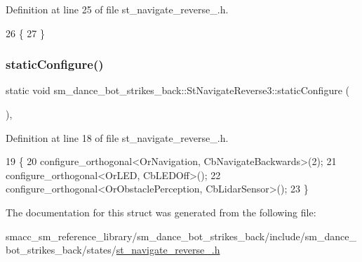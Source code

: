 Definition at line 25 of file st\+\_\+navigate\+\_\+reverse\+\_.\+h.


\begin{DoxyCode}
26    \{
27    \}
\end{DoxyCode}
\mbox{\label{structsm__dance__bot__strikes__back_1_1StNavigateReverse3_a4670afe58480a98550b4139930b95e41}} 
\subsubsection{\texorpdfstring{static\+Configure()}{staticConfigure()}}
{\footnotesize\ttfamily static void sm\+\_\+dance\+\_\+bot\+\_\+strikes\+\_\+back\+::\+St\+Navigate\+Reverse3\+::static\+Configure (\begin{DoxyParamCaption}{ }\end{DoxyParamCaption})\hspace{0.3cm}{\ttfamily [inline]}, {\ttfamily [static]}}



Definition at line 18 of file st\+\_\+navigate\+\_\+reverse\+\_.\+h.


\begin{DoxyCode}
19    \{
20       configure\_orthogonal<OrNavigation, CbNavigateBackwards>(2);
21       configure\_orthogonal<OrLED, CbLEDOff>();
22       configure\_orthogonal<OrObstaclePerception, CbLidarSensor>();
23    \}
\end{DoxyCode}


The documentation for this struct was generated from the following file\+:\begin{DoxyCompactItemize}
\item 
smacc\+\_\+sm\+\_\+reference\+\_\+library/sm\+\_\+dance\+\_\+bot\+\_\+strikes\+\_\+back/include/sm\+\_\+dance\+\_\+bot\+\_\+strikes\+\_\+back/states/\hyperlink{strikes__back_2include_2sm__dance__bot__strikes__back_2states_2st__navigate__reverse__3_8h}{st\+\_\+navigate\+\_\+reverse\+\_.\+h}\end{DoxyCompactItemize}
